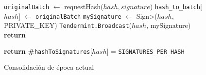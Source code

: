   \begin{figure}[t!]
  \begin{adjustbox}{minipage=[t]{\columnwidth}}
    \begin{algorithm}[H]
      \renewcommand{\thealgorithm}{ABCI Haschain - Parte 2}         
      \caption{\small Consolidación de época actual}%
      \label{alg:abci-hash2}%
      \small
      \begin{algorithmic}[1]
            	\label{alg:hash_revert}
                \State \texttt{originalBatch} $\leftarrow$ requestHash($hash, signature$)
					\State \texttt{hash\_to\_batch}[$hash$]  $\leftarrow$ \texttt{originalBatch}     
                			\State \texttt{mySignature} $\leftarrow$ \<Sign>($hash$, PRIVATE\_KEY)
                			\State \texttt{Tendermint.Broadcast}($hash$, mySignature)
					\EndIf   
				\EndIf             	
                	\State \textbf{return}
            \EndFunction
            
             \label{alg:hash_consolidated}
            		\State \textbf{return} \textbf{\#}\texttt{hashToSignatures}[$hash$] = \texttt{SIGNATURES\_PER\_HASH}
            \EndFunction

        \end{algorithmic}
      \end{algorithm}
	\end{adjustbox}
  \end{figure}
  